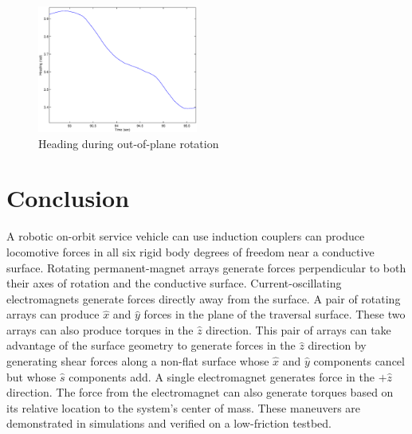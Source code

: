 \documentclass[letterpaper, 10 pt, conference]{ieeeconf}  %
\begin{document}
      
         \begin{figure}[thpb]
      \centering
      \includegraphics[width = 0.47\textwidth]{figures/oop_rotation_heading.eps}
      \caption{Heading during out-of-plane rotation}
      \label{fig:ooprotation}
   \end{figure}

  


\section{Conclusion}
A robotic on-orbit service vehicle can use induction couplers can produce locomotive forces in all six rigid body degrees of freedom near a conductive surface. Rotating permanent-magnet arrays generate forces perpendicular to both their axes of rotation and the conductive surface. Current-oscillating electromagnets generate forces directly away from the surface. A pair of rotating arrays can produce $\hat{x}$ and $\hat{y}$ forces in the plane of the traversal surface. These two arrays can also produce torques in the $\hat{z}$ direction. This pair of arrays can take advantage of the surface geometry to generate forces in the $\hat{z}$ direction by generating shear forces along a non-flat surface whose $\hat{x}$ and $\hat{y}$ components cancel but whose $\hat{s}$ components add. A single electromagnet generates force in the $+\hat{z}$ direction. The force from the electromagnet can also generate torques based on its relative location to the system's center of mass. These maneuvers are demonstrated in simulations and verified on a low-friction testbed.  
\end{document}
